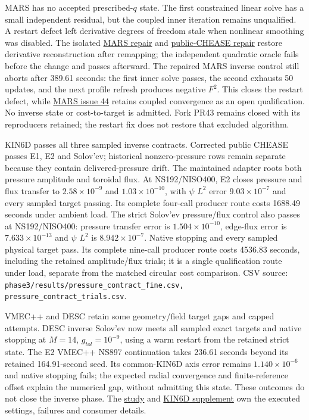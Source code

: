 \documentclass[10pt,a4paper]{article}
\newcommand{\tcroot}{https://gitlab.tugraz.at/plasma/proj/ntv/iter_tc24/-/blob/5f267d12c/}
\newcommand{\tcfile}[2]{\href{\tcroot#1}{#2}}
\newcommand{\dataref}[1]{{\footnotesize CSV source: \texttt{#1}}}
\begin{document}
MARS has no accepted prescribed-$q$ state. The first constrained linear
solve has a small independent residual, but the coupled inner iteration
remains unqualified. A restart defect left derivative degrees of freedom
stale when nonlinear smoothing was disabled. The isolated
\href{https://github.com/krystophny/MARS-Q/pull/50}{MARS repair}
and \href{https://github.com/itpplasma/chease/pull/21}{public-CHEASE repair}
restore derivative reconstruction after remapping; the independent quadratic
oracle fails before the change and passes afterward.
The repaired MARS inverse control still aborts after 389.61 seconds:
the first inner solve passes, the second exhausts 50 updates, and the next
profile refresh produces negative $F^2$. This closes the restart defect,
while \href{https://github.com/krystophny/MARS-Q/issues/44}{MARS issue 44}
retains coupled convergence as an open qualification. No inverse state or
cost-to-target is admitted. Fork PR43 remains closed with its reproducers
retained; the restart fix does not restore that excluded algorithm.

KIN6D passes all three sampled inverse contracts. Corrected public CHEASE
passes E1, E2 and Solov'ev; historical nonzero-pressure rows remain separate because
they contain delivered-pressure drift. The maintained adapter roots both
pressure amplitude and toroidal flux. At NS192/NISO400, E2 closes pressure
and flux transfer to $2.58\times10^{-9}$ and $1.03\times10^{-10}$,
with $\psi$ $L^2$ error $9.03\times10^{-7}$ and every sampled target passing.
Its complete four-call producer route costs 1688.49 seconds under ambient load.
The strict Solov'ev pressure/flux control also passes at NS192/NISO400:
pressure transfer error is $1.504\times10^{-10}$, edge-flux error is
$7.633\times10^{-13}$ and $\psi$ $L^2$ is $8.942\times10^{-7}$.
Native stopping and every sampled physical target pass. Its complete
nine-call producer route costs 4536.83 seconds, including the retained
amplitude/flux trials; it is a single qualification route under load,
separate from the matched circular cost comparison.
\dataref{phase3/results/pressure\_contract\_fine.csv,
pressure\_contract\_trials.csv}.

VMEC++ and DESC retain
some geometry/field target gaps and capped attempts. DESC inverse Solov'ev
now meets all sampled exact targets and native stopping at $M=14$,
$g_{tol}=10^{-9}$, using a warm restart from the retained strict state. The E2 VMEC++ NS897 continuation takes 236.61 seconds beyond its retained
164.91-second seed. Its common-KIN6D axis error remains $1.140\times10^{-6}$
and native stopping fails; the expected radial convergence and finite-reference
offset explain the numerical gap, without admitting this state. These outcomes
do not close the inverse phase. The \tcfile{equilibrium/phase3/results/README.md}{study}
and \tcfile{equilibrium/phase3/results/kin6d.md}{KIN6D supplement} own the
executed settings, failures and consumer details.
\end{document}
